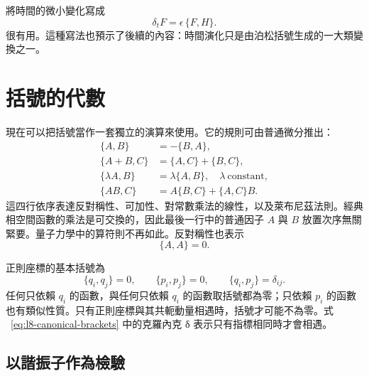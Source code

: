 \begin{classroomqa}
\end{classroomqa}

將時間的微小變化寫成
\begin{equation}
  \delta_t F=\epsilon\,\{F,H\}.
  \label{eq:l8-small-time-step}
\end{equation}
很有用。這種寫法也預示了後續的內容：時間演化只是由泊松括號生成的一大類變換之一。

\section{括號的代數}

現在可以把括號當作一套獨立的演算來使用。它的規則可由普通微分推出：
\begin{align}
  \{A,B\}&=-\{B,A\}, \label{eq:l8-antisymmetry}\\
  \{A+B,C\}&=\{A,C\}+\{B,C\}, \label{eq:l8-additivity}\\
  \{\lambda A,B\}&=\lambda\{A,B\},
    \quad \lambda\ \text{constant}, \label{eq:l8-scalar-rule}\\
  \{AB,C\}&=A\{B,C\}+\{A,C\}B. \label{eq:l8-leibniz}
\end{align}
這四行依序表達反對稱性、可加性、對常數乘法的線性，以及萊布尼茲法則。經典相空間函數的乘法是可交換的，因此最後一行中的普通因子 \(A\) 與 \(B\) 放置次序無關緊要。量子力學中的算符則不再如此。反對稱性也表示
\begin{equation}
  \{A,A\}=0.
  \label{eq:l8-self-bracket}
\end{equation}

正則座標的基本括號為
\begin{equation}
  \boxed{
  \{q_i,q_j\}=0,\qquad
  \{p_i,p_j\}=0,\qquad
  \{q_i,p_j\}=\delta_{ij}.}
  \label{eq:l8-canonical-brackets}
\end{equation}
任何只依賴 \(q_i\) 的函數，與任何只依賴 \(q_i\) 的函數取括號都為零；只依賴 \(p_i\) 的函數也有類似性質。只有正則座標與其共軛動量相遇時，括號才可能不為零。式 ~\eqref{eq:l8-canonical-brackets} 中的克羅內克 {\proseunicodefont δ} 表示只有指標相同時才會相遇。

\subsection{以諧振子作為檢驗}


